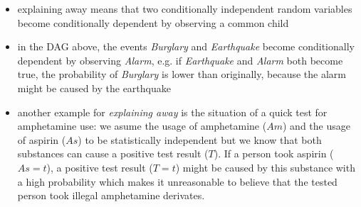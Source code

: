 \documentclass[10pt,a4paper]{article}
\begin{document}
\begin{enumerate}[a)]
		\begin{itemize}
			\item explaining away means that two conditionally independent random variables become conditionally dependent by observing a common child
			\item in the DAG above, the events \textit{Burglary} and \textit{Earthquake} become conditionally dependent by observing \textit{Alarm}, e.g. if \textit{Earthquake} and \textit{Alarm}
			both become true, the probability of \textit{Burglary} is lower than originally, because the alarm might be caused by the earthquake
			\item another example for \textit{explaining away} is the situation of a quick test for amphetamine use: we asume the usage of amphetamine ($Am$) and the usage of aspirin ($As$) to be statistically independent
			but we know that both substances can cause a positive test result ($T$). If a person took aspirin ($As=t$), a positive test result ($T=t$) might be caused by this substance with a high probability which makes it unreasonable to believe that the tested person took illegal amphetamine derivates.
		\end{itemize}


\end{enumerate}

\end{document}
